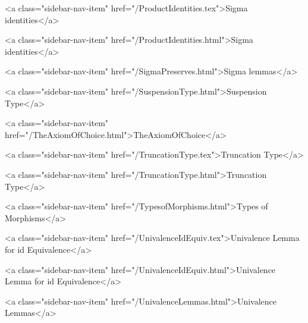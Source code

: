       
    
      
        
          <a class="sidebar-nav-item" href="/ProductIdentities.tex">Sigma identities</a>
        
      
    
      
        
          <a class="sidebar-nav-item" href="/ProductIdentities.html">Sigma identities</a>
        
      
    
      
        
          <a class="sidebar-nav-item" href="/SigmaPreserves.html">Sigma lemmas</a>
        
      
    
      
        
          <a class="sidebar-nav-item" href="/SuspensionType.html">Suspension Type</a>
        
      
    
      
        
          <a class="sidebar-nav-item" href="/TheAxiomOfChoice.html">TheAxiomOfChoice</a>
        
      
    
      
        
          <a class="sidebar-nav-item" href="/TruncationType.tex">Truncation Type</a>
        
      
    
      
        
          <a class="sidebar-nav-item" href="/TruncationType.html">Truncation Type</a>
        
      
    
      
        
          <a class="sidebar-nav-item" href="/TypesofMorphisms.html">Types of Morphisms</a>
        
      
    
      
        
          <a class="sidebar-nav-item" href="/UnivalenceIdEquiv.tex">Univalence Lemma for id Equivalence</a>
        
      
    
      
        
          <a class="sidebar-nav-item" href="/UnivalenceIdEquiv.html">Univalence Lemma for id Equivalence</a>
        
      
    
      
        
          <a class="sidebar-nav-item" href="/UnivalenceLemmas.html">Univalence Lemmas</a>
        
